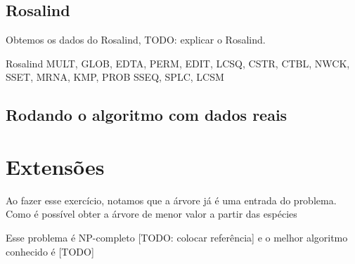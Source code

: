 \documentclass[11pt]{article}
\begin{document}
\subsection{Rosalind}
\label{sec-3-2}

Obtemos os dados do Rosalind, TODO: explicar o Rosalind.

Rosalind MULT, GLOB, EDTA, PERM, EDIT, LCSQ,
CSTR, CTBL, NWCK, SSET, MRNA, KMP, PROB
SSEQ, SPLC, LCSM

\subsection{Rodando o algoritmo com dados reais}
\label{sec-3-3}

\section{Extensões}
\label{sec-4}

Ao fazer esse exercício, notamos que a árvore já é uma entrada do problema.
Como é possível obter a árvore de menor valor a partir das espécies

Esse problema é NP-completo [TODO: colocar referência] e o melhor
algoritmo conhecido é [TODO]
\end{document}
